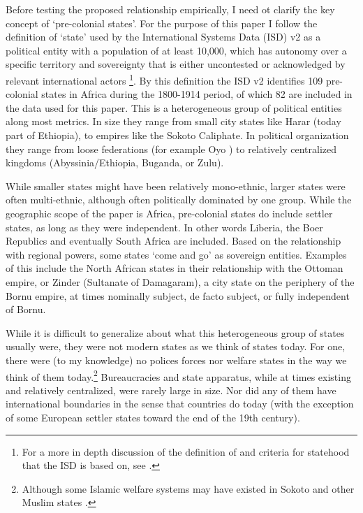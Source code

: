 \documentclass[12pt]{article}
\begin{document}
Before testing the proposed relationship empirically, I need ot clarify the key
concept of `pre-colonial states'. For the purpose of this paper I follow the
definition of `state' used by the International Systems Data (ISD) v2
\citep{Butcher2020} as a political entity with a population of at least 10,000,
which has autonomy over a specific territory and sovereignty that is either
uncontested or acknowledged by relevant international actors
\citep{Butcher2020}\footnote{For a more in depth discussion of the definition of
and criteria for statehood that the ISD is based on, see \citet{Butcher2017}.}.
By this definition the ISD v2 identifies 109 pre-colonial states in Africa
during the 1800-1914 period, of which 82 are included in the data used for this
paper. This is a heterogeneous group of political entities along most metrics.
In size they range from small city states like Harar (today part of Ethiopia),
to empires like the Sokoto Caliphate. In political organization they range from
loose federations (for example Oyo \citep{Law1977}) to relatively centralized
kingdoms (Abyssinia/Ethiopia, Buganda, or Zulu).

While smaller states might have been relatively mono-ethnic, larger states were
often multi-ethnic, although often politically dominated by one group. While the
geographic scope of the paper is Africa, pre-colonial states do include settler
states, as long as they were independent. In other words Liberia, the Boer
Republics and eventually South Africa are included. Based on the relationship
with regional powers, some states `come and go' as sovereign entities. Examples
of this include the North African states in their relationship with the Ottoman
empire, or Zinder (Sultanate of Damagaram), a city state on the periphery of the
Bornu empire, at times nominally subject, de facto subject, or fully independent
of Bornu.

While it is difficult to generalize about what this heterogeneous group of
states usually were, they were not modern states as we think of states today.
For one, there were (to my knowledge) no polices forces nor welfare states in
the way we think of them today.\footnote{Although some Islamic welfare systems
may have existed in Sokoto \citep{Buba_2018} and other Muslim states
\citep{WeissHolger2002SwiM}.} Bureaucracies and state apparatus, while at times
existing and relatively centralized, were rarely large in size. Nor did
any of them have international boundaries in the sense that countries do today
(with the exception of some European settler states toward the end of the 19th
century). 
\end{document}
